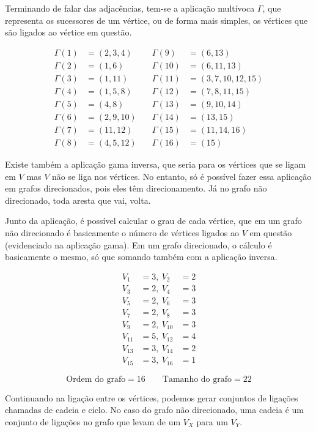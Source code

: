 \documentclass[
12pt,
a4paper,
semrecuonosumario,
sumario = abnt-6027-2012]{report}
\begin{document}
Terminando de falar das adjacências, tem-se a aplicação multívoca $\Gamma$, que representa os sucessores de um vértice, ou de forma mais simples, os vértices que são ligados ao vértice em questão.

\[
\begin{alignedat}{2}
\Gamma(1)  &= (2,3,4)      &\quad \Gamma(9)  &= (6,13) \\
\Gamma(2)  &= (1,6)        &\quad \Gamma(10) &= (6,11,13) \\
\Gamma(3)  &= (1,11)       &\quad \Gamma(11) &= (3,7,10,12,15) \\
\Gamma(4)  &= (1,5,8)      &\quad \Gamma(12) &= (7,8,11,15) \\
\Gamma(5)  &= (4,8)        &\quad \Gamma(13) &= (9,10,14) \\
\Gamma(6)  &= (2,9,10)     &\quad \Gamma(14) &= (13,15) \\
\Gamma(7)  &= (11,12)      &\quad \Gamma(15) &= (11,14,16) \\
\Gamma(8)  &= (4,5,12)     &\quad \Gamma(16) &= (15)
\end{alignedat}
\]

Existe também a aplicação gama inversa, que seria para os vértices que se ligam em $V$ mas $V$ não se liga nos vértices.
No entanto, só é possível fazer essa aplicação em grafos direcionados, pois eles têm direcionamento.
Já no grafo não direcionado, toda aresta que vai, volta.

Junto da aplicação, é possível calcular o grau de cada vértice, que em um grafo não direcionado é basicamente o número de vértices ligados ao $V$ em questão (evidenciado na aplicação gama).
Em um grafo direcionado, o cálculo é basicamente o mesmo, só que somando também com a aplicação inversa.

\[
\begin{aligned}
V_1 &= 3, \
V_2 &= 2 \\
V_3 &= 2, \
V_4 &= 3 \\
V_5 &= 2, \
V_6 &= 3 \\
V_7 &= 2, \
V_8 &= 3 \\
V_9 &= 2, \
V_{10} &= 3 \\
V_{11} &= 5, \
V_{12} &= 4 \\
V_{13} &= 3,\
V_{14} &= 2 \\
V_{15} &= 3,\
V_{16} &= 1
\end{aligned}
\]

\[
\text{Ordem do grafo} = 16 \qquad \text{Tamanho do grafo} = 22
\]

Continuando na ligação entre os vértices, podemos gerar conjuntos de ligações chamadas de cadeia e ciclo.
No caso do grafo não direcionado, uma cadeia é um conjunto de ligações no grafo que levam de um $V_X$ para um $V_Y$.
\end{document}
